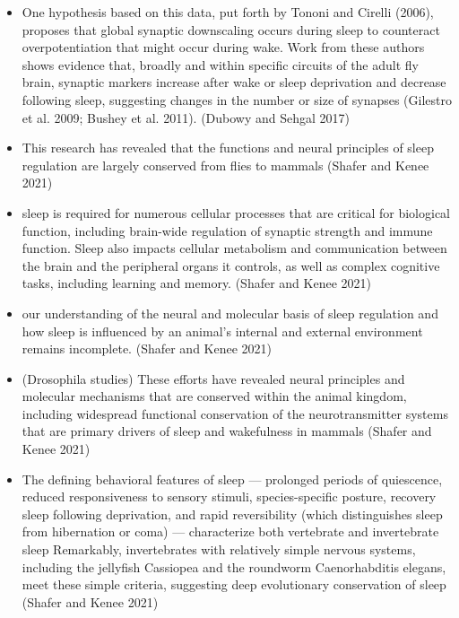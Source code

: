 \documentclass[11pt]{article}
\begin{document}
\begin{itemize}
    \item One hypothesis based on this data, put forth by Tononi and Cirelli (2006), proposes 
    that global synaptic downscaling occurs during sleep to counteract overpotentiation that 
    might occur during wake.
    Work from these authors shows evidence that, broadly and within specific circuits of the 
    adult fly brain, synaptic markers increase after wake or sleep deprivation and decrease 
    following sleep, suggesting changes in the number or size of synapses 
    (Gilestro et al. 2009; Bushey et al. 2011).
    \parencite{dubowyCircadianRhythmsSleep2017} (Dubowy and Sehgal 2017)

    \item This research has revealed that the functions and neural principles of sleep regulation are largely conserved from flies to mammals
    \parencite{shaferRegulationDrosophilaSleep2021} (Shafer and Kenee 2021)

    \item sleep is required for numerous cellular processes that are critical for biological function, including brain-wide regulation of synaptic strength and immune function.
    Sleep also impacts cellular metabolism and communication between the brain and the peripheral organs it controls, as well as complex cognitive tasks, including learning and memory.
    \parencite{shaferRegulationDrosophilaSleep2021} (Shafer and Kenee 2021)

    \item our understanding of the neural and molecular basis of sleep regulation and how sleep is influenced by an animal’s internal and external environment remains incomplete.
    \parencite{shaferRegulationDrosophilaSleep2021} (Shafer and Kenee 2021)

    \item (Drosophila studies) These efforts have revealed neural principles and molecular mechanisms that are conserved within the animal kingdom, including widespread functional conservation of the neurotransmitter systems that are primary drivers of sleep and wakefulness in mammals
    \parencite{shaferRegulationDrosophilaSleep2021} (Shafer and Kenee 2021)

    \item The defining behavioral features of sleep — prolonged periods of quiescence, reduced responsiveness to sensory stimuli, species-specific posture, recovery sleep following deprivation, and rapid reversibility (which distinguishes sleep from hibernation or coma) — characterize both vertebrate and invertebrate sleep
    Remarkably, invertebrates with relatively simple nervous systems, including the jellyfish Cassiopea and the roundworm Caenorhabditis elegans, meet these simple criteria, suggesting deep evolutionary conservation of sleep
    \parencite{shaferRegulationDrosophilaSleep2021} (Shafer and Kenee 2021)


\end{itemize}
\end{document}
